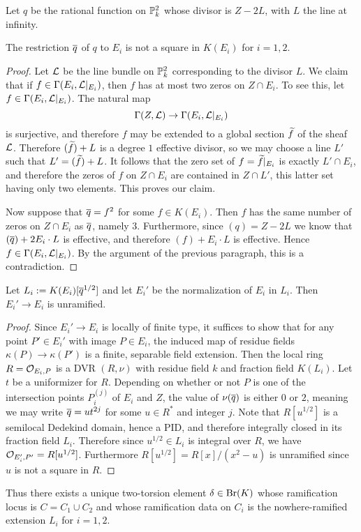 Let $q$ be the rational function on $\mathbb{P}^2_k$ whose divisor is $Z-2L$, with $L$ the line at infinity.  
\begin{lem}
The restriction $\overline{q}$ of $q$ to $E_i$ is not a square in $K(E_i)$ for $i=1,2$.
\end{lem}
\begin{proof}
Let $\mathcal{L}$ be the line bundle on $\mathbb{P}^2_k$ corresponding to the divisor $L$.  We claim that if $f\in \Gamma(E_i,\mathcal{L}|_{E_i})$, then $f$ has at most two zeros on $Z\cap E_i$.  To see this, let $f\in \Gamma(E_i,\mathcal{L}|_{E_i})$.  The natural map
$$\Gamma(Z,\mathcal{L})\rightarrow\Gamma(E_i,\mathcal{L}|_{E_i})$$
is surjective, and therefore $f$ may be extended to a global section $\widetilde f$ of the sheaf $\mathcal{L}$.  Therefore $(\widetilde f) + L$ is a degree $1$ effective divisor, so we may choose a line $L'$ such that $L' = (\widetilde f) + L$.  It follows that the zero set of $f = \widetilde f|_{E_i}$ is exactly $L'\cap E_i$, and therefore the zeros of $f$ on $Z\cap E_i$ are contained in $Z\cap L'$, this latter set having only two elements.  This proves our claim.

Now suppose that $\overline{q} = f^2$ for some $f\in K(E_i)$.  Then $f$ has the same number of zeros on $Z\cap E_i$ as $\overline{q}$, namely $3$.  Furthermore, since $(q) = Z-2L$ we know that $(\overline{q}) + 2E_i\cdot L$ is effective, and therefore $(f) + E_i\cdot L$ is effective.  Hence $f\in \Gamma(E_i,\mathcal{L}|_{E_i})$.  By the argument of the previous paragraph, this is a contradiction.
\end{proof}

\begin{lem}
Let $L_i:=K(E_i)[\overline{q}^{1/2}]$ and let $E_i'$ be the normalization of $E_i$ in $L_i$.  Then $E_i'\rightarrow E_i$ is unramified.
\end{lem}
\begin{proof}
Since $E_i'\rightarrow E_i$ is locally of finite type, it suffices to show that for any point $P'\in E_i'$ with image $P\in E_i$, the induced map of residue fields $\kappa(P)\rightarrow\kappa(P')$ is a finite, separable field extension.  Then the local ring $R = \mathcal{O}_{E_i,P}$ is a DVR $(R,\nu)$ with residue field $k$ and fraction field $K(L_i)$.  Let $t$ be a uniformizer for $R$.  Depending on whether or not $P$ is one of the intersection points $P_i^{(j)}$ of $E_i$ and $Z$, the value of $\nu(\overline{q})$ is either $0$ or $2$, meaning we may write $\overline{q} = ut^{2j}$ for some $u\in R^*$ and integer $j$.  Note that $R[u^{1/2}]$ is a semilocal Dedekind domain, hence a PID, and therefore integrally closed in its fraction field $L_i$.  Therefore since $u^{1/2}\in L_i$ is integral over $R$, we have $\mathcal{O}_{E_i',P'} = R[u^{1/2}]$.  Furthermore $R[u^{1/2}] = R[x]/(x^2-u)$ is unramified since $u$ is not a square in $R$.
\end{proof}
Thus there exists a unique two-torsion element $\delta\in\textnormal{Br}(K)$ whose ramification locus is $C = C_1\cup C_2$ and whose ramification data on $C_i$ is the nowhere-ramified extension $L_i$ for $i=1,2$.

